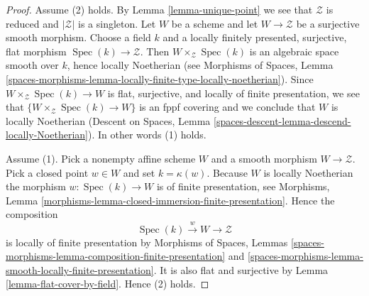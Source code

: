 \documentclass[10pt,a4paper]{amsart}
\theoremstyle{plain}
\theoremstyle{definition}
\theoremstyle{remark}
\numberwithin{equation}{subsection}
\def\Spec{\mathop{\mathrm{Spec}}}
\begin{document}
\begin{proof}
Assume (2) holds. By
Lemma \ref{lemma-unique-point}
we see that $\mathcal{Z}$ is reduced and $|\mathcal{Z}|$ is a singleton.
Let $W$ be a scheme and let $W \to \mathcal{Z}$ be a surjective smooth
morphism. Choose a field $k$ and a locally finitely presented, surjective,
flat morphism $\Spec(k) \to \mathcal{Z}$.
Then $W \times_\mathcal{Z} \Spec(k)$ is an algebraic space
smooth over $k$, hence locally Noetherian (see
Morphisms of Spaces, Lemma
\ref{spaces-morphisms-lemma-locally-finite-type-locally-noetherian}).
Since $W \times_\mathcal{Z} \Spec(k) \to W$
is flat, surjective, and locally of finite presentation, we see
that $\{W \times_\mathcal{Z} \Spec(k) \to W\}$ is an fppf covering
and we conclude that $W$ is locally Noetherian
(Descent on Spaces, Lemma
\ref{spaces-descent-lemma-descend-locally-Noetherian}).
In other words (1) holds.

\medskip\noindent
Assume (1). Pick a nonempty affine scheme $W$ and a smooth morphism
$W \to \mathcal{Z}$. Pick a closed point $w \in W$ and set
$k = \kappa(w)$. Because $W$ is locally Noetherian the morphism
$w : \Spec(k) \to W$ is of finite presentation, see
Morphisms, Lemma \ref{morphisms-lemma-closed-immersion-finite-presentation}.
Hence the composition
$$
\Spec(k) \xrightarrow{w} W \longrightarrow \mathcal{Z}
$$
is locally of finite presentation by
Morphisms of Spaces, Lemmas
\ref{spaces-morphisms-lemma-composition-finite-presentation} and
\ref{spaces-morphisms-lemma-smooth-locally-finite-presentation}.
It is also flat and surjective by
Lemma \ref{lemma-flat-cover-by-field}.
Hence (2) holds.
\end{proof}
\end{document}
